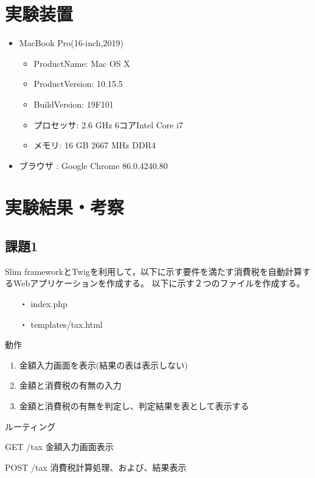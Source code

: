 \documentclass[12pt]{jarticle}
\begin{document}
\clearpage

\section{実験装置}
\begin{itemize}
    \item MacBook Pro(16-inch,2019)
          \begin{itemize}
              \item ProductName: Mac OS X
              \item ProductVersion:	10.15.5
              \item BuildVersion: 19F101
              \item プロセッサ: 2.6 GHz 6コアIntel Core i7
              \item メモリ: 16 GB 2667 MHz DDR4
          \end{itemize}
    \item ブラウザ : Google Chrome 86.0.4240.80
\end{itemize}


\section{実験結果・考察}
\subsection{課題1}
\begin{shadebox}
    Slim frameworkとTwigを利用して，以下に示す要件を満たす消費税を自動計算するWebアプリケーションを作成する。
    以下に示す２つのファイルを作成する。
    \begin{itemize}
        \item[・] index.php
        \item[・] templates/tax.html
    \end{itemize}

    動作
    \begin{enumerate}
        \item 金額入力画面を表示(結果の表は表示しない)
        \item 金額と消費税の有無の入力
        \item 金額と消費税の有無を判定し、判定結果を表として表示する
    \end{enumerate}
    ルーティング

    GET  /tax 金額入力画面表示

    POST /tax 消費税計算処理、および、結果表示
\end{shadebox}
\end{document}
